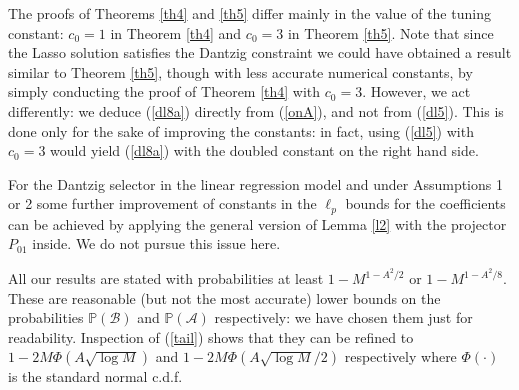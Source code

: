 \documentclass[dvips,aos]{imsart}
\numberwithin{equation}{section}
\theoremstyle{plain}
\def\A{\mbox{$\mathcal A$}}
\def\B{\mbox{$\mathcal B$}}
\def\PP{\mathbb{P}}
\begin{document}
\begin{list}{}
\item
The proofs of Theorems \ref{th4} and \ref{th5} differ mainly in the
value of the tuning constant: $c_0=1$ in Theorem \ref{th4} and
$c_0=3$ in Theorem \ref{th5}. Note that since the Lasso solution
satisfies the Dantzig constraint we could have obtained a result
similar to Theorem \ref{th5}, though with less accurate numerical
constants, by simply conducting the proof of Theorem \ref{th4} with
$c_0=3$. However, we act differently: we deduce (\ref{dl8a})
directly from (\ref{onA}), and not from (\ref{dl5}). This is done
only for the sake of improving the constants: in fact, using
(\ref{dl5}) with $c_0=3$ would yield (\ref{dl8a}) with the doubled
constant on the right hand side.

\item
For the Dantzig selector in the linear regression model and under
Assumptions 1 or 2 some further improvement of constants in the
$\ell_p$ bounds for the coefficients can be achieved by applying the
general version of Lemma \ref{l2} with the projector $P_{01}$
inside. We do not pursue this issue here.

\item
All our results are stated with probabilities at least
$1-M^{1-A^2/2}$ or $1-M^{1-A^2/8}$. These are reasonable (but not
the most accurate) lower bounds on the probabilities $\PP(\B)$ and
$\PP(\A)$ respectively: we have chosen them just for readability.
 Inspection of (\ref{tail}) shows that
they can be refined to $1-2M\Phi(A\sqrt{\log M})$ and
$1-2M\Phi(A\sqrt{\log M}/2)$ respectively where $\Phi(\cdot)$ is the
standard normal c.d.f.
\end{list}
\appendix
\section{}
\label{app:re}
\end{document}
